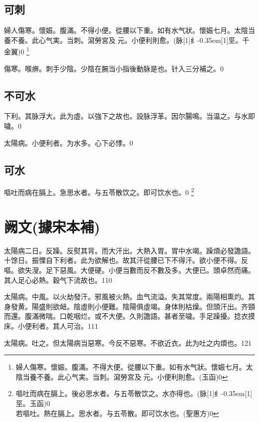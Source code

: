 \documentclass[11pt,oneside,b5paper]{ctexbook}
\begin{document}
\begin{flushleft}
\section{可刺}

婦人傷寒。懷娠。腹滿。不得小便。從腰以下重。如有水气狀。懷娠七月。太陰当養不養。此心气実。当刺。瀉勞宮及{𬮦}元。小便利則愈。(脉{\hbox{\scalebox{0.68}[1]{纟}\kern-0.35em\scalebox{0.64}[1]{巠}}}。千金翼)0
\footnote{婦人傷寒。懷娠。腹滿。不得大便。從腰以下重。如有水气狀。懷娠七月。太陰当養不養。此心气実。当刺。瀉勞宮及{𬮦}元。小便利則愈。(玉函)0}

傷寒。喉痹。刺手少陰。少陰在腕当小指後動脉是也。针入三分補之。0

\section{不可水}

下利。其脉浮大。此为虛。以強下之故也。設脉浮革。因尔腸鳴。当温之。与水即噦。0

太陽病。小便利者。为水多。心下必悸。0

\section{可水}

嘔吐而病在膈上。急思水者。与五苓散饮之。即可饮水也。0
\footnote{嘔吐而病在膈上。後必思水者。与五苓散饮之。水亦得也。(脉{\hbox{\scalebox{0.68}[1]{纟}\kern-0.35em\scalebox{0.64}[1]{巠}}}。玉函)0\\若嘔吐。熱在膈上。思水者。与五苓散。即可饮水也。(聖惠方)0}

\chapter{阙文(據宋本補)}

太陽病二日。反躁。反熨其背。而大汗出。大熱入胃。胃中水竭。躁煩必發譫語。十馀日。振慄自下利者。此为欲解也。故其汗從腰已下不得汗。欲小便不得。反嘔。欲失溲。足下惡風。大便硬。小便当數而反不數及多。大便已。頭卓然而痛。其人足心必熱。穀气下流故也。110

太陽病。中風。以火劫發汗。邪風被火熱。血气流溢。失其常度。兩陽相熏灼。其身發黄。陽盛則欲衄。陰虛則小便難。陰陽俱虛竭。身体則枯燥。但頭汗出。齐頸而還。腹滿微喘。口乾咽烂。或不大便。久則譫語。甚者至噦。手足躁擾。捻衣摸床。小便利者。其人可治。111

太陽病。吐之。但太陽病当惡寒。今反不惡寒。不欲近衣。此为吐之内煩也。121


\end{flushleft}
\end{document}

